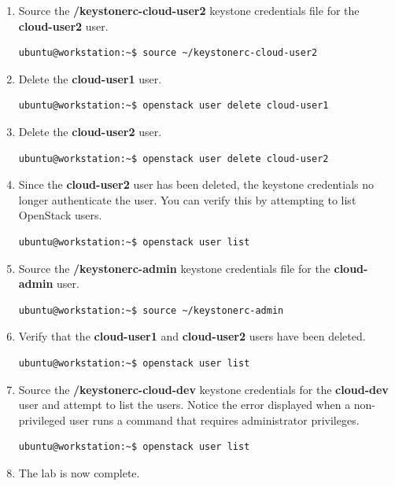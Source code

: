 \documentclass[letterpaper, 12pt]{article}
\begin{document}
\begin{enumerate}
    \item Source the \textbf{\texttildemid/keystonerc-cloud-user2} keystone credentials file for the
    \textbf{cloud-user2} user.
\begin{lstlisting}
ubuntu@workstation:~$ source ~/keystonerc-cloud-user2
\end{lstlisting}

    \item Delete the \textbf{cloud-user1} user.
\begin{lstlisting}
ubuntu@workstation:~$ openstack user delete cloud-user1
\end{lstlisting}

    \item Delete the \textbf{cloud-user2} user.
\begin{lstlisting}
ubuntu@workstation:~$ openstack user delete cloud-user2
\end{lstlisting}    

    \item Since the \textbf{cloud-user2} user has been deleted, the keystone credentials no longer authenticate the
    user. You can verify this by attempting to list OpenStack users.
\begin{lstlisting}
ubuntu@workstation:~$ openstack user list
\end{lstlisting}

    \item Source the \textbf{\texttildemid/keystonerc-admin} keystone credentials file for the \textbf{cloud-admin}
    user.
\begin{lstlisting}
ubuntu@workstation:~$ source ~/keystonerc-admin
\end{lstlisting}

    \item Verify that the \textbf{cloud-user1} and \textbf{cloud-user2} users have been deleted.
\begin{lstlisting}
ubuntu@workstation:~$ openstack user list
\end{lstlisting}

    \item Source the \textbf{\texttildemid/keystonerc-cloud-dev} keystone credentials for the \textbf{cloud-dev} user and
    attempt to list the users. Notice the error displayed when a non-privileged user runs a command that requires
    administrator privileges.
\begin{lstlisting}
ubuntu@workstation:~$ openstack user list
\end{lstlisting}

    \item The lab is now complete.

\end{enumerate}
\end{document}
